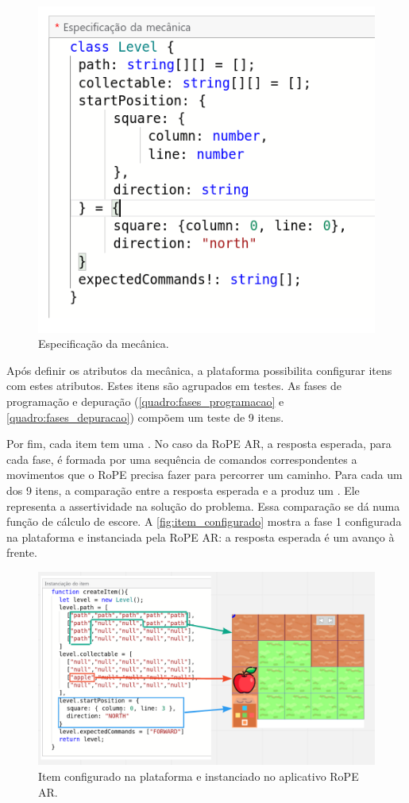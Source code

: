 \begin{figure}[htpb]
    \centering
    \includegraphics[width=.5\linewidth,fbox]{figs/mecanica.png}
    \caption{Especificação da mecânica.}
    \sourceauthor
    \label{fig:mecanica}
\end{figure}

Após definir os atributos da mecânica, a plataforma possibilita configurar itens com estes atributos. Estes itens são agrupados em testes. As fases de programação e depuração (\autoref{quadro:fases_programacao} e \autoref{quadro:fases_depuracao}) compõem um teste de 9 itens.

Por fim, cada item tem uma . No caso da RoPE AR, a resposta esperada, para cada fase, é formada por uma sequência de comandos correspondentes a movimentos que o RoPE precisa fazer para percorrer um caminho. Para cada um dos 9 itens, a comparação entre a resposta esperada e a  produz um . Ele representa a assertividade na solução do problema. Essa comparação se dá numa função de cálculo de escore. A \autoref{fig:item_configurado} mostra a fase 1 configurada na plataforma e instanciada pela RoPE AR: a resposta esperada é um avanço à frente.

\begin{figure}
    \centering
    \includegraphics[width=.6\linewidth,fbox]{figs/item_configurado.png}
    \caption{Item configurado na plataforma e instanciado no aplicativo RoPE AR.}
    \sourceauthor
    \label{fig:item_configurado}
\end{figure}

